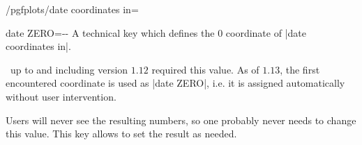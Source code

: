 {\begin{stylekey}{/pgfplots/date coordinates in=}
\begin{codeexample}[]
\end{codeexample}
\end{stylekey}

\begin{pgfplotskey}{date ZERO=--}
	A technical key which defines the $0$ coordinate of |date coordinates in|. 
	
	\PGFPlots\ up to and including version $1.12$ required this value. As of $1.13$, the first encountered coordinate is used as |date ZERO|, i.e. it is assigned automatically without user intervention.

	Users will never see the resulting numbers, so one probably never needs to change this value. This key allows to set the result as needed.
\end{pgfplotskey}

}
